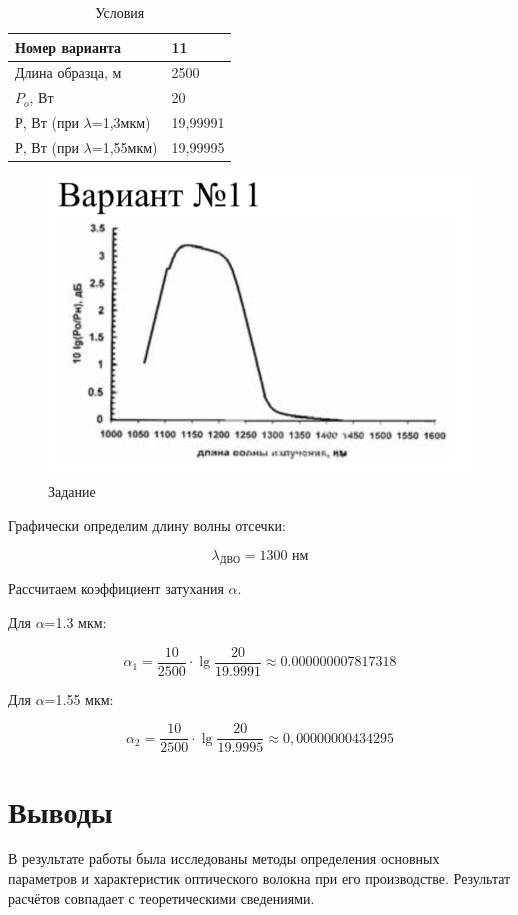     \begin{table}[ht]
    	\caption{Условия}
	\begin{tabular}{|l|l|}
		\hline
		Номер варианта & 11		\\ \hline
		Длина образца, м & 2500 \\ \hline
		$P_o$, Вт & 20 \\ \hline
		Р, Вт (при $\lambda$=1,3мкм) & 19,99991 \\ \hline
		Р, Вт (при $\lambda$=1,55мкм) & 19,99995 \\ \hline
	\end{tabular}
\end{table}


\begin{figure}[h!]
	\centering
	\caption{Задание}
	\includegraphics[width=.8\textwidth]{images/task.png}
\end{figure}

Графически определим длину волны отсечки:

\[
\lambda_\text{ДВО} = 1300 \text{ нм}
\]

Рассчитаем коэффициент затухания $\alpha$.

Для $\alpha$=1.3 мкм:

\[
\alpha_1 = \frac{10}{2500} \cdot \lg \frac{20}{19.9991} \approx 0.000000007817318
\]

Для $\alpha$=1.55 мкм:

\[
\alpha_2 = \frac{10}{2500} \cdot \lg \frac{20}{19.9995} \approx 0,00000000434295
\]

\begin{figure}[H]
	\centering
\end{figure}

\chapter{Выводы}

В результате работы была исследованы методы определения основных параметров и характеристик оптического волокна при его производстве. Результат расчётов совпадает с теоретическими сведениями. 